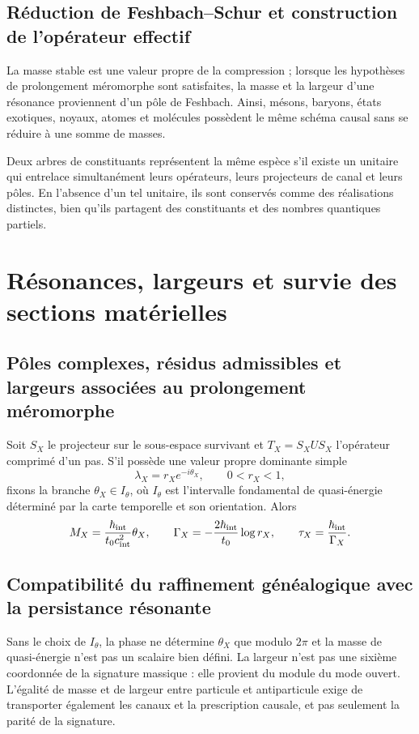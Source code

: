 \subsection{Réduction de Feshbach--Schur et construction de l'opérateur effectif}

La masse stable est une valeur propre de la compression ; lorsque les hypothèses de prolongement méromorphe sont satisfaites, la masse et la largeur d'une résonance proviennent d'un pôle de Feshbach. Ainsi, mésons, baryons, états exotiques, noyaux, atomes et molécules possèdent le même schéma causal sans se réduire à une somme de masses.

Deux arbres de constituants représentent la même espèce s'il existe un
unitaire qui entrelace simultanément leurs opérateurs, leurs projecteurs de canal et leurs
pôles. En l'absence d'un tel unitaire, ils sont conservés comme des réalisations distinctes,
bien qu'ils partagent des constituants et des nombres quantiques partiels.

\section{Résonances, largeurs et survie des sections matérielles}

\subsection{Pôles complexes, résidus admissibles et largeurs associées au prolongement méromorphe}

Soit \(S_X\) le projecteur sur le sous-espace survivant et
\(T_X=S_X U S_X\) l'opérateur comprimé d'un pas. S'il possède une valeur propre
dominante simple
\[
 \lambda_X=r_X e^{-i\theta_X},\qquad 0<r_X<1,
\]
fixons la branche \(\theta_X\in I_\theta\), où \(I_\theta\) est l'intervalle
fondamental de quasi-énergie déterminé par la carte temporelle et son orientation.
Alors
\[
 M_X=\frac{\hbar_{\rm int}}{t_0c_{\rm int}^2}\theta_X,
 \qquad
 \Gamma_X=-\frac{2\hbar_{\rm int}}{t_0}\log r_X,
 \qquad
 \tau_X=\frac{\hbar_{\rm int}}{\Gamma_X}.
\]
\subsection{Compatibilité du raffinement généalogique avec la persistance résonante}

Sans le choix de \(I_\theta\), la phase ne détermine \(\theta_X\) que modulo
\(2\pi\) et la masse de quasi-énergie n'est pas un scalaire bien défini.
La largeur n'est pas une sixième coordonnée de la signature massique : elle provient du module
du mode ouvert. L'égalité de masse et de largeur entre particule et
antiparticule exige de transporter également les canaux et la prescription causale, et pas seulement
la parité de la signature.

